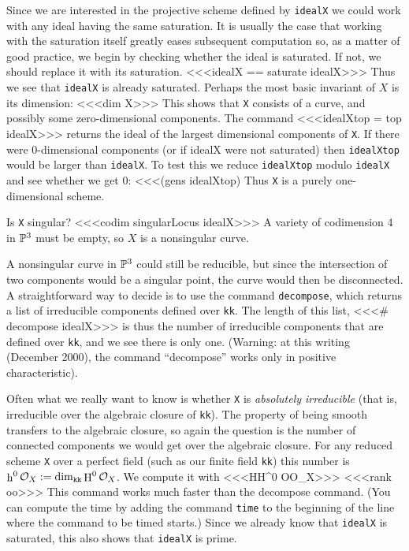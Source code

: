 Since we are interested in the projective scheme defined by 
{\tt idealX} we could work with any ideal having the same
saturation. It is usually the case that working with the
saturation itself greatly eases subsequent computation so,
as a matter of good practice, 
we begin by checking whether the ideal is saturated. If
not, we should replace it with its saturation.
<<<idealX == saturate idealX>>>
Thus we see that {\tt idealX} is already saturated.
Perhaps the most basic invariant of $X$ is its dimension:
<<<dim X>>>
This shows that {\tt X} consists of a curve, and
possibly some zero-dimensional components.
The command
<<<idealXtop = top idealX>>>
%
returns the ideal of the largest dimensional components of {\tt X}.
If there were 0-dimensional components (or if idealX were not saturated)
then {\tt idealXtop} would be larger than {\tt idealX}.
To test this we reduce {\tt idealXtop} modulo {\tt idealX}
and see whether we get 0:
<<<(gens idealXtop)%
Thus
{\tt X}
is a purely one-dimensional scheme.


Is {\tt X}
singular?
<<<codim singularLocus idealX>>>
%
A variety of codimension 4 in $\P^3$ must be empty, so $X$
is a nonsingular curve. 

A nonsingular curve in $\P^3$ could still be reducible,
but since the intersection of two components
would be a singular point, the curve would then be disconnected.
A straightforward
way to decide is to use the command {\tt decompose},
which returns a list of irreducible components defined over {\tt kk}. 
The length
of this list,
<<<# decompose idealX>>>
%
%
%
is thus the number of irreducible components
that are defined over {\tt kk}, and
we see there is only one. (Warning: at this writing (December 2000), 
the command
``decompose'' works only in positive characteristic).  

Often what we really want to know is
whether {\tt X} is 
{\it absolutely irreducible\/} (that is, irreducible over the 
algebraic closure of {\tt kk}).
The property of being smooth transfers to the algebraic
closure, so again the question is the number of connected
components we would get over the algebraic closure.
{}For any reduced scheme {\tt X} over a perfect
{}field (such as our finite field {\tt kk}) this number is
$\mathop{\rm h}\nolimits^0\cO_X := \mathop{\rm dim}\nolimits_{\tt kk}\mathop{\rm H}\nolimits^0\cO_X$.
We compute it with
<<<HH^0 OO_X>>>
<<<rank oo>>>
This command works much faster than the decompose command.
(You can compute the time by adding the command {\tt time}
to the beginning of the line where the command to be timed
starts.) Since we already know that {\tt idealX} is saturated,
this also shows that {\tt idealX} is prime.

